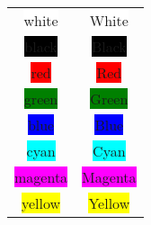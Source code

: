 \documentclass{article}
\begin{document}
\begin{center}
\begin{tabular}{cc}
\colorbox{white}{white}     & \colorbox[named]{White}{White} \\
\colorbox{black}{black}     & \colorbox[named]{Black}{Black} \\
\colorbox{red}{red}         & \colorbox[named]{Red}{Red} \\
\colorbox{green}{green}     & \colorbox[named]{Green}{Green} \\
\colorbox{blue}{blue}       & \colorbox[named]{Blue}{Blue} \\
\colorbox{cyan}{cyan}       & \colorbox[named]{Cyan}{Cyan} \\
\colorbox{magenta}{magenta} & \colorbox[named]{Magenta}{Magenta} \\
\colorbox{yellow}{yellow}   & \colorbox[named]{Yellow}{Yellow}
\end{tabular}
\end{center}
\end{document}

